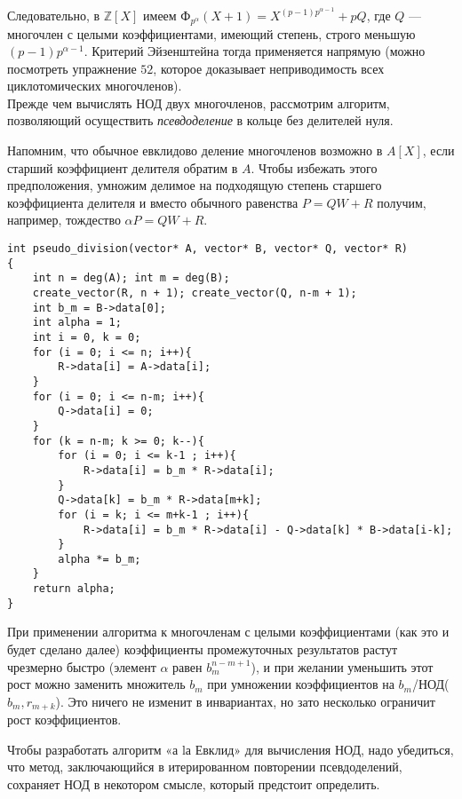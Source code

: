 \pagebreak

\noindent Следовательно, в $\mathbb{Z}[X]$ имеем Ф$_{p^ \alpha}(X+1) = X^{(p-1)p^{\alpha -1}}+pQ$, где $Q$ —
многочлен с целыми коэффициентами, имеющий степень, строго 
меньшую $(p-1)p^{\alpha -1}$. Критерий Эйзенштейна тогда применяется 
напрямую (можно посмотреть упражнение $52$, которое доказывает 
неприводимость всех циклотомических многочленов).
\\

Прежде чем вычислять НОД двух многочленов, рассмотрим 
алгоритм, позволяющий осуществить \textit{псевдоделение} в кольце без делителей
нуля.

Напомним, что обычное евклидово деление многочленов возможно
в $A[X]$, если старший коэффициент делителя обратим в $A$. Чтобы 
избежать этого предположения, умножим делимое на подходящую 
степень старшего коэффициента делителя и вместо обычного равенства
$P = QW+R$ получим, например, тождество $\alpha P = QW+R$.

\begin{lstlisting}[caption="Евклидово псевдоделение многочленов
над кольцом без делителей нуля"]
int pseudo_division(vector* A, vector* B, vector* Q, vector* R)
{
    int n = deg(A); int m = deg(B);
    create_vector(R, n + 1); create_vector(Q, n-m + 1);
    int b_m = B->data[0];
    int alpha = 1;
    int i = 0, k = 0;
    for (i = 0; i <= n; i++){
        R->data[i] = A->data[i];
    }
    for (i = 0; i <= n-m; i++){
        Q->data[i] = 0;
    }
    for (k = n-m; k >= 0; k--){
        for (i = 0; i <= k-1 ; i++){
            R->data[i] = b_m * R->data[i];
        }
        Q->data[k] = b_m * R->data[m+k];
        for (i = k; i <= m+k-1 ; i++){
            R->data[i] = b_m * R->data[i] - Q->data[k] * B->data[i-k];
        }
        alpha *= b_m;
    }
    return alpha;
}
\end{lstlisting}

При применении алгоритма к многочленам с целыми 
коэффициентами (как это и будет сделано далее) коэффициенты 
промежуточных результатов растут чрезмерно быстро (элемент $\alpha$ равен $b_m^{n-m+1}$), и при желании уменьшить этот рост можно заменить множитель $b_m$ при умножении коэффициентов на $b_m$/НОД($b_m, r_{m+k}$). Это ничего не
изменит в инвариантах, но зато несколько ограничит рост 
коэффициентов.

Чтобы разработать алгоритм «а lа Евклид» для вычисления НОД,
надо убедиться, что метод, заключающийся в итерированном повторении псевдоделений, сохраняет НОД в некотором смысле, который
предстоит определить.

